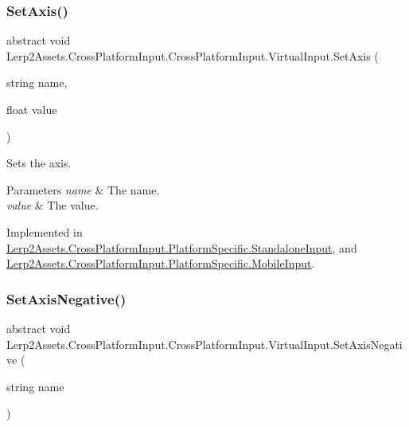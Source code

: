 \subsubsection{\texorpdfstring{Set\+Axis()}{SetAxis()}}
{\footnotesize\ttfamily abstract void Lerp2\+Assets.\+Cross\+Platform\+Input.\+Cross\+Platform\+Input.\+Virtual\+Input.\+Set\+Axis (\begin{DoxyParamCaption}\item[{string}]{name,  }\item[{float}]{value }\end{DoxyParamCaption})\hspace{0.3cm}{\ttfamily [pure virtual]}}



Sets the axis. 


\begin{DoxyParams}{Parameters}
{\em name} & The name.\\
\hline
{\em value} & The value.\\
\hline
\end{DoxyParams}


Implemented in \hyperlink{class_lerp2_assets_1_1_cross_platform_input_1_1_platform_specific_1_1_standalone_input_a350dafd6b0bb5d5b1b1d63c09664c498}{Lerp2\+Assets.\+Cross\+Platform\+Input.\+Platform\+Specific.\+Standalone\+Input}, and \hyperlink{class_lerp2_assets_1_1_cross_platform_input_1_1_platform_specific_1_1_mobile_input_a3362c1940a517c89512f38a2d13cbde0}{Lerp2\+Assets.\+Cross\+Platform\+Input.\+Platform\+Specific.\+Mobile\+Input}.

\mbox{\label{class_lerp2_assets_1_1_cross_platform_input_1_1_cross_platform_input_1_1_virtual_input_af420a2c8478dd23fd7ecc2ba035eeb88}} 
\subsubsection{\texorpdfstring{Set\+Axis\+Negative()}{SetAxisNegative()}}
{\footnotesize\ttfamily abstract void Lerp2\+Assets.\+Cross\+Platform\+Input.\+Cross\+Platform\+Input.\+Virtual\+Input.\+Set\+Axis\+Negative (\begin{DoxyParamCaption}\item[{string}]{name }\end{DoxyParamCaption})\hspace{0.3cm}{\ttfamily [pure virtual]}}



